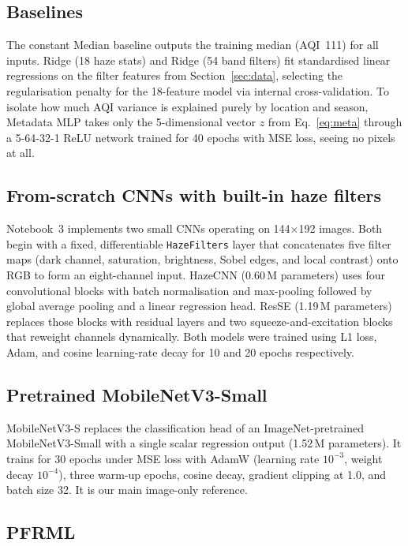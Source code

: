 \documentclass[conference]{IEEEtran}
\begin{document}
\subsection{Baselines}

The constant Median baseline outputs the training median (AQI~111) for all
inputs. Ridge (18 haze stats) and Ridge (54 band filters) fit standardised
linear regressions on the filter features from Section~\ref{sec:data}, selecting
the regularisation penalty for the 18-feature model via internal
cross-validation. To isolate how much AQI variance is explained purely by
location and season, Metadata MLP takes only the 5-dimensional vector $z$ from
Eq.~\eqref{eq:meta} through a 5-64-32-1 ReLU network trained for 40 epochs with
MSE loss, seeing no pixels at all.

\subsection{From-scratch CNNs with built-in haze filters}

Notebook~3 implements two small CNNs operating on 144$\times$192 images. Both
begin with a fixed, differentiable \texttt{HazeFilters} layer that concatenates
five filter maps (dark channel, saturation, brightness, Sobel edges, and local
contrast) onto RGB to form an eight-channel input. HazeCNN (0.60\,M parameters)
uses four convolutional blocks with batch normalisation and max-pooling followed
by global average pooling and a linear regression head. ResSE (1.19\,M
parameters) replaces those blocks with residual layers and two
squeeze-and-excitation blocks that reweight channels dynamically. Both models
were trained using L1 loss, Adam, and cosine learning-rate decay for 10 and 20
epochs respectively.

\subsection{Pretrained MobileNetV3-Small}

MobileNetV3-S replaces the classification head of an ImageNet-pretrained
MobileNetV3-Small \cite{howard2019mobilenetv3} with a single scalar regression
output (1.52\,M parameters). It trains for 30 epochs under MSE loss with AdamW
(learning rate $10^{-3}$, weight decay $10^{-4}$), three warm-up epochs, cosine
decay, gradient clipping at 1.0, and batch size 32. It is our main image-only
reference.

\subsection{PFRML}
\end{document}
